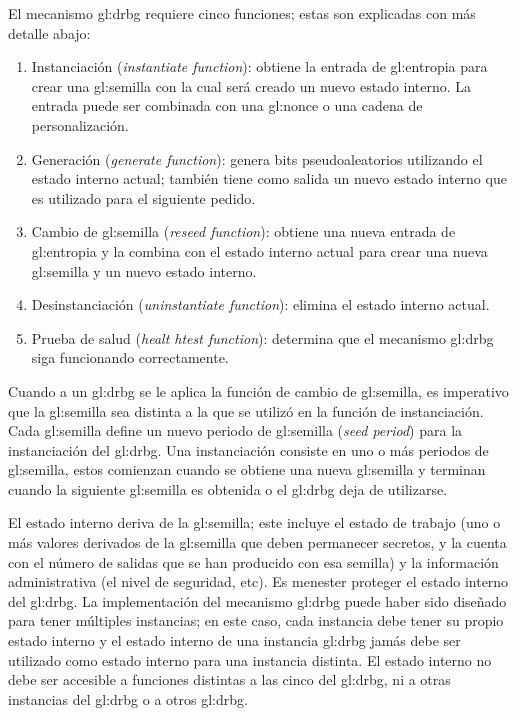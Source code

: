 El mecanismo \gls{gl:drbg} requiere cinco funciones; estas son explicadas con
más detalle abajo:
\begin{enumerate}
    \item Instanciación (\textit{instantiate function}): obtiene la entrada de
        \gls{gl:entropia} para crear una \gls{gl:semilla} con la cual será
        creado un nuevo estado interno. La entrada puede ser combinada con
        una \gls{gl:nonce} o una cadena de personalización.
    \item Generación (\textit{generate function}): genera bits pseudoaleatorios
        utilizando el estado interno actual; también tiene como salida un nuevo
        estado interno que es utilizado para el siguiente pedido.
    \item Cambio de \gls{gl:semilla} (\textit{reseed function}): obtiene una
        nueva entrada de \gls{gl:entropia} y la combina con el estado interno
        actual para crear una nueva \gls{gl:semilla} y un nuevo estado interno.
    \item Desinstanciación (\textit{uninstantiate function}): elimina el estado
        interno actual.
    \item Prueba de salud (\textit{healt htest function}): determina que el
        mecanismo \gls{gl:drbg} siga funcionando correctamente.
\end{enumerate}

Cuando a un \gls{gl:drbg} se le aplica la función de cambio de \gls{gl:semilla},
es imperativo que la \gls{gl:semilla} sea distinta a la que se utilizó en la
función de instanciación. Cada \gls{gl:semilla} define un nuevo
periodo de \gls{gl:semilla} (\textit{seed period}) para la instanciación del
\gls{gl:drbg}. Una instanciación consiste en uno o más periodos de
\gls{gl:semilla}, estos comienzan cuando se obtiene una nueva \gls{gl:semilla} y
terminan cuando la siguiente \gls{gl:semilla} es obtenida o el \gls{gl:drbg}
deja de utilizarse.

El estado interno deriva de la \gls{gl:semilla}; este incluye el estado de
trabajo (uno o más valores derivados de la \gls{gl:semilla} que deben
permanecer secretos, y la cuenta con el número de salidas que se han producido
con esa semilla) y la información administrativa (el nivel de seguridad, etc).
Es menester proteger el estado interno del \gls{gl:drbg}. La implementación del
mecanismo \gls{gl:drbg} puede haber sido diseñado para tener múltiples
instancias; en este caso, cada instancia debe tener su propio estado interno y
el estado interno de una instancia \gls{gl:drbg} jamás debe ser utilizado como
estado interno para una instancia distinta. El estado interno no debe ser
accesible a funciones distintas a las cinco del \gls{gl:drbg}, ni a otras
instancias del \gls{gl:drbg} o a otros \gls{gl:drbg}.

